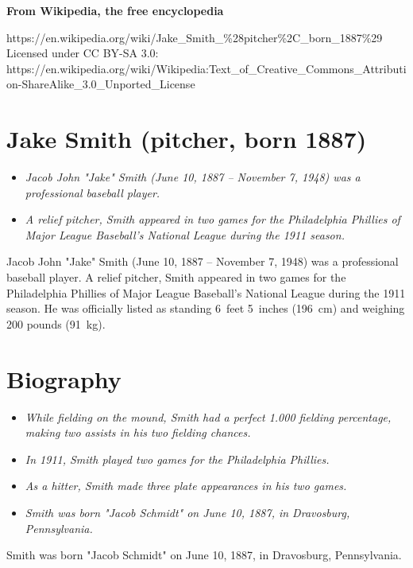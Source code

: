 \textbf{From Wikipedia, the free encyclopedia}

https://en.wikipedia.org/wiki/Jake\_Smith\_\%28pitcher\%2C\_born\_1887\%29\\
Licensed under CC BY-SA 3.0:\\
https://en.wikipedia.org/wiki/Wikipedia:Text\_of\_Creative\_Commons\_Attribution-ShareAlike\_3.0\_Unported\_License

\section{Jake Smith (pitcher, born
1887)}\label{jake-smith-pitcher-born-1887}

\begin{itemize}
\item
  \emph{Jacob John "Jake" Smith (June 10, 1887 -- November 7, 1948) was
  a professional baseball player.}
\item
  \emph{A relief pitcher, Smith appeared in two games for the
  Philadelphia Phillies of Major League Baseball's National League
  during the 1911 season.}
\end{itemize}

Jacob John "Jake" Smith (June 10, 1887 -- November 7, 1948) was a
professional baseball player. A relief pitcher, Smith appeared in two
games for the Philadelphia Phillies of Major League Baseball's National
League during the 1911 season. He was officially listed as standing
6~feet 5~inches (196~cm) and weighing 200 pounds (91~kg).

\section{Biography}\label{biography}

\begin{itemize}
\item
  \emph{While fielding on the mound, Smith had a perfect 1.000 fielding
  percentage, making two assists in his two fielding chances.}
\item
  \emph{In 1911, Smith played two games for the Philadelphia Phillies.}
\item
  \emph{As a hitter, Smith made three plate appearances in his two
  games.}
\item
  \emph{Smith was born "Jacob Schmidt" on June 10, 1887, in Dravosburg,
  Pennsylvania.}
\end{itemize}

Smith was born "Jacob Schmidt" on June 10, 1887, in Dravosburg,
Pennsylvania.

